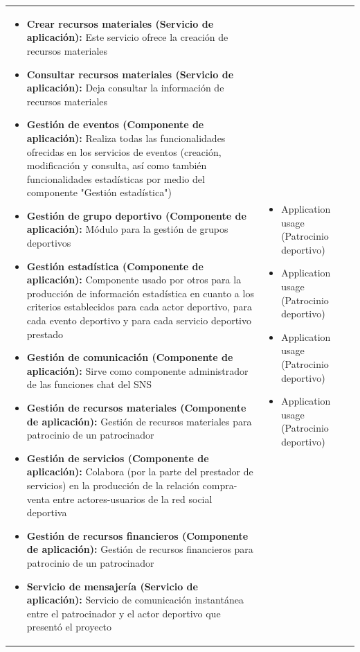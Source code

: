 \begin{table}[!htb]
\begin{center}
{\begin{tabular}{|p{7cm}|p{4cm}|}
\begin{itemize}
				\item \textbf{Crear recursos materiales (Servicio de aplicación):} Este servicio ofrece la creación de recursos materiales
				\item \textbf{Consultar recursos materiales (Servicio de aplicación):} Deja consultar la información de recursos materiales
				\item \textbf{Gestión de eventos (Componente de aplicación):} Realiza todas las funcionalidades ofrecidas en los servicios de eventos (creación, modificación y consulta, así como también funcionalidades estadísticas por medio del componente "Gestión estadística")
				\item \textbf{Gestión de grupo deportivo (Componente de aplicación):} Módulo para la gestión de grupos deportivos
				\item \textbf{Gestión estadística (Componente de aplicación):} Componente usado por otros para la producción de información estadística en cuanto a los criterios establecidos para cada actor deportivo, para cada evento deportivo y para cada servicio deportivo prestado
				\item \textbf{Gestión de comunicación (Componente de aplicación):} Sirve como componente administrador de las funciones chat del SNS
				\item \textbf{Gestión de recursos materiales (Componente de aplicación):} Gestión de recursos materiales para patrocinio de un patrocinador
				\item \textbf{Gestión de servicios (Componente de aplicación):} Colabora (por la parte del prestador de servicios) en la producción de la relación compra-venta entre actores-usuarios de la red social deportiva
				\item \textbf{Gestión de recursos financieros (Componente de aplicación):} Gestión de recursos financieros para patrocinio de un patrocinador
				\item \textbf{Servicio de mensajería (Servicio de aplicación):} Servicio de comunicación instantánea entre el patrocinador y el actor deportivo que presentó el proyecto
			\end{itemize} 
			&
			\begin{itemize}
				\item Application usage (Patrocinio deportivo)
				\item Application usage (Patrocinio deportivo)
				\item Application usage (Patrocinio deportivo)
				\item Application usage (Patrocinio deportivo)

\end{itemize}
\end{tabular}}
\end{center}
\end{table}
